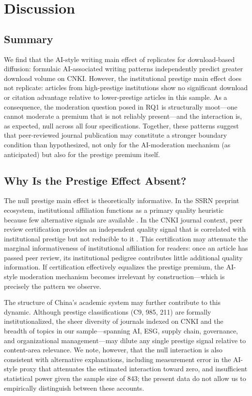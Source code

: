 \documentclass[12pt,a4paper]{article}
\begin{document}
\section{Discussion}
\label{sec:discussion}

\subsection{Summary}

We find that the AI-style writing main effect of \citet{JoLi2026}
replicates for download-based diffusion: formulaic AI-associated
writing patterns independently predict greater download volume on CNKI.
However, the institutional prestige main effect does not replicate:
articles from high-prestige institutions show no significant download
or citation advantage relative to lower-prestige articles in this sample.
As a consequence, the moderation question posed in RQ1 is structurally
moot---one cannot moderate a premium that is not reliably present---and
the interaction is, as expected, null across all four specifications.
Together, these patterns suggest that peer-reviewed journal publication
may constitute a stronger boundary condition than hypothesized, not only
for the AI-moderation mechanism (as anticipated) but also for the
prestige premium itself.

\subsection{Why Is the Prestige Effect Absent?}

The null prestige main effect is theoretically informative.
In the SSRN preprint ecosystem, institutional affiliation functions as
a primary quality heuristic because few alternative signals are
available \citep{JoLi2026}.
In the CNKI journal context, peer review certification provides an
independent quality signal that is correlated with institutional
prestige but not reducible to it \citep{Bornmann2008}.
This certification may attenuate the marginal informativeness of
institutional affiliation for readers: once an article has passed
peer review, its institutional pedigree contributes little additional
quality information.
If certification effectively equalizes the prestige premium, the AI-style
moderation mechanism becomes irrelevant by construction---which is
precisely the pattern we observe.

The structure of China's academic system may further contribute to
this dynamic.
Although prestige classifications (C9, 985, 211) are formally
institutionalized, the sheer diversity of journals indexed on CNKI
and the breadth of topics in our sample---spanning AI, ESG, supply
chain, governance, and organizational management---may dilute any
single prestige signal relative to content-area relevance.
We note, however, that the null interaction is also consistent with
alternative explanations, including measurement error in the AI-style
proxy that attenuates the estimated interaction toward zero, and
insufficient statistical power given the sample size of 843;
the present data do not allow us to empirically distinguish between
these accounts.
\end{document}
